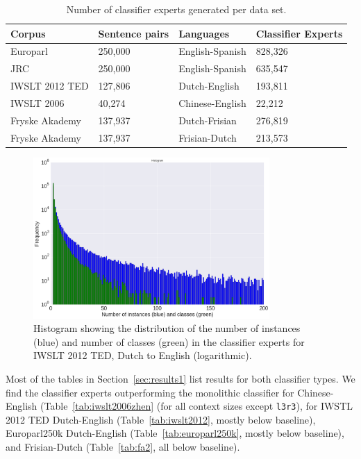 \documentclass[smallextended]{svjour3}       %
\theoremstyle{break}
\begin{document}
\begin{table}
\begin{center}
\begin{tabular}{|lll|l|}
\hline
\textbf{Corpus} & \textbf{Sentence pairs} & \textbf{Languages} & \textbf{Classifier Experts} \\
\hline
Europarl & 250,000 & English-Spanish & 828,326 \\
JRC & 250,000 & English-Spanish & 635,547 \\
IWSLT 2012 TED & 127,806 & Dutch-English & 193,811 \\
IWSLT 2006 & 40,274 & Chinese-English & 22,212 \\
Fryske Akademy & 137,937 & Dutch-Frisian & 276,819 \\
Fryske Akademy & 137,937 & Frisian-Dutch & 213,573 \\
\hline
\end{tabular}
\caption{Number of classifier experts generated per data set.}
\label{tab:expertcount}
\end{center}
\end{table}


\begin{figure}
\begin{center}
\includegraphics[width=90.00mm]{classifierhistogram.png}
\caption{Histogram showing the distribution of the number of instances (blue)
and number of classes (green) in the classifier experts for IWSLT 2012 TED,
Dutch to English (logarithmic).}
\label{fig:histogram}
\end{center}
\end{figure}

Most of the tables in Section~\ref{sec:results1} list results for both classifier
types.  We find the classifier experts outperforming the monolithic classifier
for Chinese-English (Table~\ref{tab:iwslt2006zhen} (for all context sizes except
\texttt{l3r3}), for  IWSTL 2012 TED Dutch-English (Table~\ref{tab:iwslt2012},
mostly below baseline), Europarl250k Dutch-English
(Table~\ref{tab:europarl250k}, mostly below baseline), and Frisian-Dutch
(Table~\ref{tab:fa2}, all below baseline).
\end{document}
